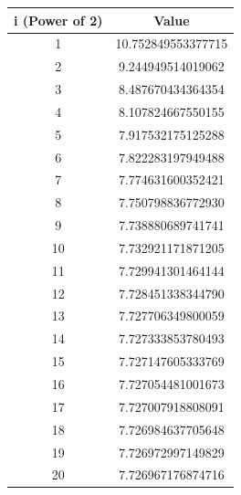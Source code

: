 \documentclass[10pt,oneside,a4paper]{article}
\begin{document}
\begin{flushleft}
\begin{table}[]
\centering
\begin{tabular}{|c|c|}
\hline
\textbf{i (Power of 2)} & \textbf{Value}     \\ \hline
1                       & 10.752849553377715 \\ \hline
2                       & 9.244949514019062  \\ \hline
3                       & 8.487670434364354  \\ \hline
4                       & 8.107824667550155  \\ \hline
5                       & 7.917532175125288  \\ \hline
6                       & 7.822283197949488  \\ \hline
7                       & 7.774631600352421  \\ \hline
8                       & 7.750798836772930  \\ \hline
9                       & 7.738880689741741  \\ \hline
10                      & 7.732921171871205  \\ \hline
11                      & 7.729941301464144  \\ \hline
12                      & 7.728451338344790  \\ \hline
13                      & 7.727706349800059  \\ \hline
14                      & 7.727333853780493  \\ \hline
15                      & 7.727147605333769  \\ \hline
16                      & 7.727054481001673  \\ \hline
17                      & 7.727007918808091  \\ \hline
18                      & 7.726984637705648  \\ \hline
19                      & 7.726972997149829  \\ \hline
20                      & 7.726967176874716  \\ \hline
\end{tabular}
\end{table}
\end{flushleft}
\end{document}
